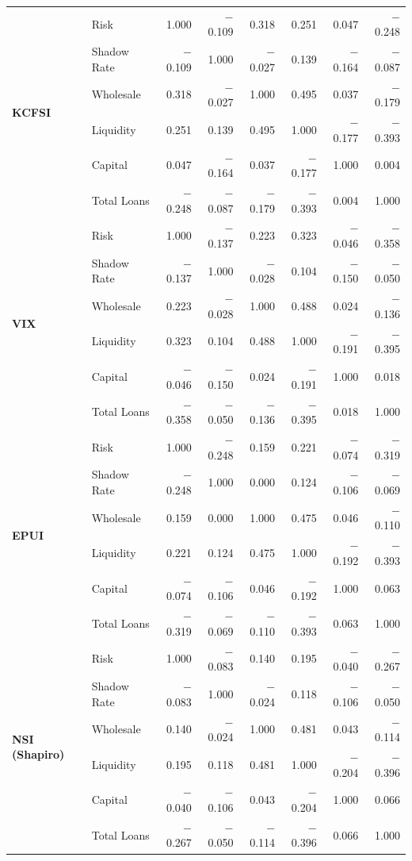 \documentclass[12pt,a4paper]{report}
\begin{document}
\begin{table}[H]
{\begin{tabular}{ll rrrrrr}
\multirow{6}{*}{\textbf{KCFSI}}
 & Risk          &  1.000 & $-$0.109 &  0.318 &  0.251 &  0.047 & $-$0.248 \\
 & Shadow Rate   & $-$0.109 &  1.000 & $-$0.027 &  0.139 & $-$0.164 & $-$0.087 \\
 & Wholesale     &  0.318 & $-$0.027 &  1.000 &  0.495 &  0.037 & $-$0.179 \\
 & Liquidity     &  0.251 &  0.139 &  0.495 &  1.000 & $-$0.177 & $-$0.393 \\
 & Capital       &  0.047 & $-$0.164 &  0.037 & $-$0.177 &  1.000 &  0.004 \\
 & Total Loans   & $-$0.248 & $-$0.087 & $-$0.179 & $-$0.393 &  0.004 &  1.000 \\
\midrule

\multirow{6}{*}{\textbf{VIX}}
 & Risk          &  1.000 & $-$0.137 &  0.223 &  0.323 & $-$0.046 & $-$0.358 \\
 & Shadow Rate   & $-$0.137 &  1.000 & $-$0.028 &  0.104 & $-$0.150 & $-$0.050 \\
 & Wholesale     &  0.223 & $-$0.028 &  1.000 &  0.488 &  0.024 & $-$0.136 \\
 & Liquidity     &  0.323 &  0.104 &  0.488 &  1.000 & $-$0.191 & $-$0.395 \\
 & Capital       & $-$0.046 & $-$0.150 &  0.024 & $-$0.191 &  1.000 &  0.018 \\
 & Total Loans   & $-$0.358 & $-$0.050 & $-$0.136 & $-$0.395 &  0.018 &  1.000 \\
\midrule

\multirow{6}{*}{\textbf{EPUI}}
 & Risk          &  1.000 & $-$0.248 &  0.159 &  0.221 & $-$0.074 & $-$0.319 \\
 & Shadow Rate   & $-$0.248 &  1.000 &  0.000 &  0.124 & $-$0.106 & $-$0.069 \\
 & Wholesale     &  0.159 &  0.000 &  1.000 &  0.475 &  0.046 & $-$0.110 \\
 & Liquidity     &  0.221 &  0.124 &  0.475 &  1.000 & $-$0.192 & $-$0.393 \\
 & Capital       & $-$0.074 & $-$0.106 &  0.046 & $-$0.192 &  1.000 &  0.063 \\
 & Total Loans   & $-$0.319 & $-$0.069 & $-$0.110 & $-$0.393 &  0.063 &  1.000 \\
\midrule

\multirow{6}{*}{\textbf{NSI (Shapiro)}}
 & Risk          &  1.000 & $-$0.083 &  0.140 &  0.195 & $-$0.040 & $-$0.267 \\
 & Shadow Rate   & $-$0.083 &  1.000 & $-$0.024 &  0.118 & $-$0.106 & $-$0.050 \\
 & Wholesale     &  0.140 & $-$0.024 &  1.000 &  0.481 &  0.043 & $-$0.114 \\
 & Liquidity     &  0.195 &  0.118 &  0.481 &  1.000 & $-$0.204 & $-$0.396 \\
 & Capital       & $-$0.040 & $-$0.106 &  0.043 & $-$0.204 &  1.000 &  0.066 \\
 & Total Loans   & $-$0.267 & $-$0.050 & $-$0.114 & $-$0.396 &  0.066 &  1.000 \\
\midrule


\end{tabular}}
\end{table}
\end{document}
